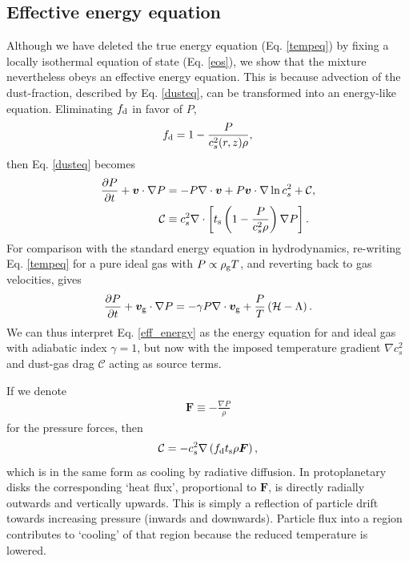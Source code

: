 \subsection{Effective energy equation}\label{energy_analogy}
Although we have deleted the true energy
equation (Eq. \ref{tempeq}) by fixing a locally isothermal
equation of state (Eq. \ref{eos}), we show that the mixture 
nevertheless obeys an effective energy equation. This is
because advection of the dust-fraction, described by
Eq. \ref{dusteq}, can be transformed into an energy-like 
equation. 
Eliminating $f_\mathrm{d}$ in favor of $P$, 
\begin{align*}
  f_\mathrm{d} = 1 - \frac{P}{c_s^2(r,z)\rho}, 
\end{align*}
then Eq. \ref{dusteq} becomes
\begin{align}
\frac{\partial P}{\partial t} + \bm{v}\cdot\nabla P  
&= - P \nabla\cdot\bm{v} + P\bm{v}\cdot\nabla\ln{c_s^2}
                + \mathcal{C},  \label{eff_energy} \\
\mathcal{C}&\equiv c_s^2 \nabla\cdot\left[t_\mathrm{s}\left(1 -
  \frac{P}{c_s^2\rho}\right)\nabla 
  P\right].
\end{align} 
For comparison with the standard energy equation in hydrodynamics,
re-writing Eq. \ref{tempeq} for a pure ideal gas with $P \propto
\rho_\mathrm{g} T$, and reverting back to gas velocities, gives  
\begin{align}
  \frac{\partial P}{\partial t} + \bm{v}_\mathrm{g}\cdot\nabla P = - \gamma P
  \nabla\cdot \bm{v}_\mathrm{g}  +
  \frac{P}{T}\left(\mathcal{H} -
    \Lambda\right).\label{real_pressure} 
\end{align} 
We can thus interpret Eq. \ref{eff_energy} as the energy equation for
and ideal gas with adiabatic index $\gamma=1$, but now with the
imposed temperature gradient $\nabla c_s^2$ and dust-gas drag $\mathcal{C}$ 
acting as source terms. 

   
If we denote 
\begin{align}
  \bm{F} \equiv  - \frac{\nabla P}{\rho}
\end{align}
for the pressure forces, then
\begin{align*}
  \mathcal{C} = - c_s^2\nabla \left( f_\mathrm{d} t_\mathrm{s} \rho \bm{F}
  \right), 
\end{align*}
which is in the same form as cooling by radiative diffusion. In protoplanetary
disks the corresponding `heat flux', proportional to $\bm{F}$, is
directly radially outwards and vertically upwards. This is simply a
reflection of particle drift towards increasing pressure (inwards and 
downwards). Particle flux into a region contributes to `cooling' of
that region because the reduced temperature is lowered. 

